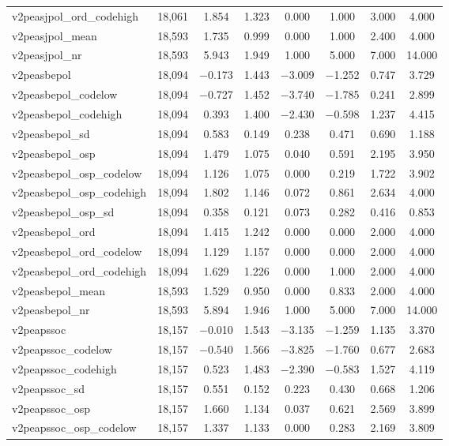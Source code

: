 \begin{table}[!htbp]
\begin{tabular}{@{\extracolsep{5pt}}lccccccc}
v2peasjpol\_ord\_codehigh & 18,061 & 1.854 & 1.323 & 0.000 & 1.000 & 3.000 & 4.000 \\ 
v2peasjpol\_mean & 18,593 & 1.735 & 0.999 & 0.000 & 1.000 & 2.400 & 4.000 \\ 
v2peasjpol\_nr & 18,593 & 5.943 & 1.949 & 1.000 & 5.000 & 7.000 & 14.000 \\ 
v2peasbepol & 18,094 & $-$0.173 & 1.443 & $-$3.009 & $-$1.252 & 0.747 & 3.729 \\ 
v2peasbepol\_codelow & 18,094 & $-$0.727 & 1.452 & $-$3.740 & $-$1.785 & 0.241 & 2.899 \\ 
v2peasbepol\_codehigh & 18,094 & 0.393 & 1.400 & $-$2.430 & $-$0.598 & 1.237 & 4.415 \\ 
v2peasbepol\_sd & 18,094 & 0.583 & 0.149 & 0.238 & 0.471 & 0.690 & 1.188 \\ 
v2peasbepol\_osp & 18,094 & 1.479 & 1.075 & 0.040 & 0.591 & 2.195 & 3.950 \\ 
v2peasbepol\_osp\_codelow & 18,094 & 1.126 & 1.075 & 0.000 & 0.219 & 1.722 & 3.902 \\ 
v2peasbepol\_osp\_codehigh & 18,094 & 1.802 & 1.146 & 0.072 & 0.861 & 2.634 & 4.000 \\ 
v2peasbepol\_osp\_sd & 18,094 & 0.358 & 0.121 & 0.073 & 0.282 & 0.416 & 0.853 \\ 
v2peasbepol\_ord & 18,094 & 1.415 & 1.242 & 0.000 & 0.000 & 2.000 & 4.000 \\ 
v2peasbepol\_ord\_codelow & 18,094 & 1.129 & 1.157 & 0.000 & 0.000 & 2.000 & 4.000 \\ 
v2peasbepol\_ord\_codehigh & 18,094 & 1.629 & 1.226 & 0.000 & 1.000 & 2.000 & 4.000 \\ 
v2peasbepol\_mean & 18,593 & 1.529 & 0.950 & 0.000 & 0.833 & 2.000 & 4.000 \\ 
v2peasbepol\_nr & 18,593 & 5.894 & 1.946 & 1.000 & 5.000 & 7.000 & 14.000 \\ 
v2peapssoc & 18,157 & $-$0.010 & 1.543 & $-$3.135 & $-$1.259 & 1.135 & 3.370 \\ 
v2peapssoc\_codelow & 18,157 & $-$0.540 & 1.566 & $-$3.825 & $-$1.760 & 0.677 & 2.683 \\ 
v2peapssoc\_codehigh & 18,157 & 0.523 & 1.483 & $-$2.390 & $-$0.583 & 1.527 & 4.119 \\ 
v2peapssoc\_sd & 18,157 & 0.551 & 0.152 & 0.223 & 0.430 & 0.668 & 1.206 \\ 
v2peapssoc\_osp & 18,157 & 1.660 & 1.134 & 0.037 & 0.621 & 2.569 & 3.899 \\ 
v2peapssoc\_osp\_codelow & 18,157 & 1.337 & 1.133 & 0.000 & 0.283 & 2.169 & 3.809 \\ 

\end{tabular}
\end{table}
